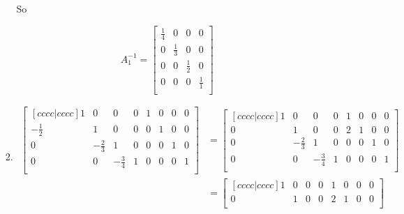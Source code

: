 \documentclass[12pt,letterpaper]{article}
\begin{document}
\begin{enumerate}
\begin{enumerate}
\begin{enumerate}[label=(\alph*)]
              So

              \[
                A_1^{-1}
                =
                \begin{bmatrix}
                  \frac{1}{4} &  0           &  0           &  0           \\
                  0           &  \frac{1}{3} &  0           &  0           \\
                  0           &  0           &  \frac{1}{2} &  0           \\
                  0           &  0           &  0           &  \frac{1}{1} \\
                \end{bmatrix}
              \]
            \item
              \begin{align*}
                \begin{bmatrix}[c c c c | c c c c]
                   1            &  0            &  0            &  0 &  1 &  0 &  0 &  0 \\
                   -\frac{1}{2} &  1            &  0            &  0 &  0 &  1 &  0 &  0 \\
                   0            &  -\frac{2}{3} &  1            &  0 &  0 &  0 &  1 &  0 \\
                   0            &  0            &  -\frac{3}{4} &  1 &  0 &  0 &  0 &  1 \\
                \end{bmatrix}
                &=
                \begin{bmatrix}[c c c c | c c c c]
                   1            &  0            &  0            &  0 &  1 &  0 &  0 &  0 \\
                   0            &  1            &  0            &  0 &  2 &  1 &  0 &  0 \\
                   0            &  -\frac{2}{3} &  1            &  0 &  0 &  0 &  1 &  0 \\
                   0            &  0            &  -\frac{3}{4} &  1 &  0 &  0 &  0 &  1 \\
                \end{bmatrix}
                \\
                &=
                \begin{bmatrix}[c c c c | c c c c]
                   1            &  0            &  0            &  0 &  1 &  0           &  0 &  0 \\
                   0            &  1            &  0            &  0 &  2 &  1           &  0 &  0 \\

\end{bmatrix}
\end{align*}
\end{enumerate}
\end{enumerate}
\end{enumerate}
\end{document}
